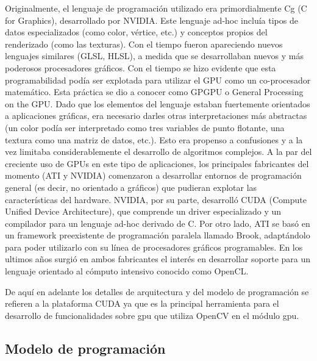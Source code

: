 \documentclass[a4paper,10pt]{report}
\begin{document}
Originalmente, el lenguaje de programación utilizado era primordialmente Cg (C for Graphics), desarrollado por NVIDIA. 
Este lenguaje ad-hoc incluía tipos de datos especializados (como color, vértice, etc.) y conceptos propios del renderizado (como las texturas). 
Con el tiempo fueron apareciendo nuevos lenguajes similares (GLSL, HLSL), a medida que se desarrollaban nuevos y más poderosos procesadores gráficos.
Con el tiempo se hizo evidente que esta programabilidad podía ser explotada para utilizar el GPU como un co-procesador matemático. 
Esta práctica se dio a conocer como GPGPU o General Processing on the GPU. 
Dado que los elementos del lenguaje estaban fuertemente orientados a aplicaciones gráficas, era necesario darles otras interpretaciones más abstractas (un color podía ser
interpretado como tres variables de punto flotante, una textura como una matriz de datos, etc.). 
Esto era propenso a confusiones y a la vez limitaba considerablemente el desarrollo de algoritmos complejos.
A la par del creciente uso de GPUs en este tipo de aplicaciones, los principales fabricantes del momento (ATI y NVIDIA) comenzaron a desarrollar entornos de programación
general (es decir, no orientado a gráficos) que pudieran explotar las características del hardware. 
NVIDIA, por su parte, desarrolló CUDA\cite{cudaDoc} (Compute Unified Device Architecture), que comprende un driver especializado y un compilador para un lenguaje ad-hoc derivado de C. 
Por otro lado, ATI se basó en un framework preexistente de programación paralela llamado Brook, adaptándolo para poder utilizarlo con su línea de procesadores gráficos programables. 
En los ultimos años surgió en ambos fabricantes el interés en desarrollar soporte para un lenguaje orientado al cómputo intensivo conocido como OpenCL\cite{openclDoc}.


De aquí en adelante los detalles de arquitectura y del modelo de programación se refieren a la plataforma CUDA ya que es la principal herramienta para el desarrollo de funcionalidades sobre gpu que utiliza OpenCV en el módulo gpu.


\subsection{Modelo de programación}
\end{document}
